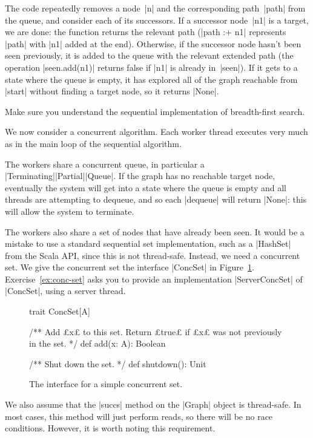 The code repeatedly removes a node~|n| and the corresponding path~|path| from
the queue, and consider each of its successors.  If a successor node~|n1| is a
target, we are done: the function returns the relevant path (|path :+ n1|
represents |path| with |n1| added at the end).  Otherwise, if the successor
node hasn't been seen previously, it is added to the queue with the relevant
extended path (the operation |seen.add(n1)| returns false if |n1| is already
in~|seen|).  If it gets to a state where the queue is empty, it has explored
all of the graph reachable from |start| without finding a target node, so it
returns |None|.

\begin{instruction}
Make sure you understand the sequential implementation of breadth-first search.
\end{instruction}


We now consider a concurrent algorithm.  Each worker thread  executes very
much as in the main loop of the sequential algorithm.

The workers share a concurrent queue, in particular a
|Terminating|\-|Partial|\-|Queue|.  If the graph has no reachable
target node, eventually the system will get into a state where the queue is
empty and all threads are attempting to dequeue, and so each |dequeue| will
return |None|: this will allow the system to terminate.

The workers also share a set of nodes that have already been seen.  It would
be a mistake to use a standard sequential set implementation, such as a
|HashSet| from the Scala API, since this is not thread-safe.  Instead, we need
a concurrent set.  We give the concurrent set the interface |ConcSet| in
Figure~\ref{fig:ConcSet}.  Exercise~\ref{ex:conc-set} asks you to provide an
implementation |ServerConcSet| of |ConcSet|, using a server thread.

\begin{figure}
\begin{scala}
trait ConcSet[A]{
  /** Add £x£ to this set.  Return £true£ if £x£ was not previously in the set. */
  def add(x: A): Boolean

  /** Shut down the set. */
  def shutdown(): Unit
}
\end{scala}
\caption{The interface for a simple concurrent set.}
\label{fig:ConcSet}
\end{figure}

We also assume that the |succs| method on the |Graph| object is thread-safe.
In most cases, this method will just perform reads, so there will be no race
conditions.  However, it is worth noting this requirement. 

